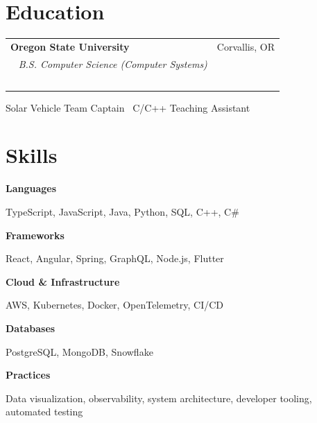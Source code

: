 \documentclass[10pt,letterpaper]{article}
\makeatletter
\newcommand{\jobblock}[4]{%
  \vspace{0.55em}
  \noindent
  \begin{tabularx}{\textwidth}{@{}X r@{}}  %
    {\bfseries\color{ink}#1} & {\color{muted}\small #2} \\\  %
    {\color{accent}\itshape #3} & {\color{muted}\small\bfseries #4} \\\  %
  \end{tabularx}
  \vspace{0.15em}
}
\newcommand{\skillrow}[2]{%
  \noindent
  {\color{accent}\bfseries\small #1}\par
  {\color{ink}#2}\par\vspace{0.35em}
}
\makeatother
\begin{document}
\section*{Education}
\jobblock{Oregon State University}{Corvallis, OR}{B.S. Computer Science (Computer Systems)}{}
\vspace{-0.25em}
{\small\color{muted} Solar Vehicle Team Captain \textbar\ C/C++ Teaching Assistant}

\section*{Skills}
\begin{minipage}[t]{0.48\textwidth}
  \skillrow{Languages}{TypeScript, JavaScript, Java, Python, SQL, C++, C\#}
  \skillrow{Frameworks}{React, Angular, Spring, GraphQL, Node.js, Flutter}
  \skillrow{Cloud \& Infrastructure}{AWS, Kubernetes, Docker, OpenTelemetry, CI/CD}
\end{minipage}\hfill
\begin{minipage}[t]{0.48\textwidth}
  \skillrow{Databases}{PostgreSQL, MongoDB, Snowflake}
  \skillrow{Practices}{Data visualization, observability, system architecture, developer tooling, automated testing}
\end{minipage}
\end{document}

